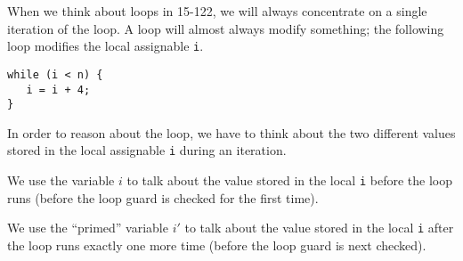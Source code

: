 \clearpage
{}


When we think about loops in 15-122, we will always concentrate on a
single iteration of the loop. A loop will almost always modify something;
the following loop modifies the local assignable \lstinline'i'.

\begin{lstlisting}
while (i < n) {
   i = i + 4;
}
\end{lstlisting}

In order to reason about the loop, we have to think about the two
different values stored in the local assignable \lstinline'i' during
an iteration.

We use the variable $i$ to talk about the value stored in the local
\lstinline'i' before the loop runs (before the loop guard is checked
for the first time).

We use the ``primed'' variable $i'$ to talk about the value stored in
the local \lstinline'i' after the loop runs exactly one more time
(before the loop guard is next checked).

\begin{parts}
\newcommand{\ans}[2][7.5em]{\fbox{\rule[-0.25ex]{0em}{3ex}\answer{#1}{#2}}}
\newcommand{\ansB}[1]{\fbox{\rule{0em}{1ex}~\answer{0em}{#1}~}}




\end{parts}
